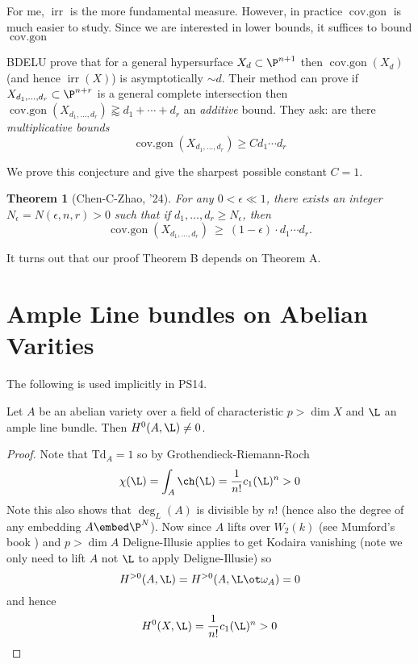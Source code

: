 \documentclass[12pt]{article}
\theoremstyle{plain}
\newtheorem{Lthm}{Theorem}
\DeclareMathOperator{\irr}{irr}
\DeclareMathOperator{\cg}{cov.gon}
\begin{document}
{\color{red} For me, $\irr$ is the more fundamental measure. However, in practice $\cg$ is much easier to study. Since we are interested in lower bounds, it suffices to bound $\cg$}

BDELU prove that for a general hypersurface $X_d \subset \P^{n+1}$ then $\cg(X_d)$ (and hence $\irr(X)$) is asymptotically $\sim d$. Their method can prove if $X_{d_1, \dots, d_r} \subset \P^{n+r}$ is a general complete intersection then $\cg(X_{d_1, \dots, d_r}) \gtrapprox d_1 + \cdots + d_r$ an \textit{additive} bound. They ask: are there \textit{multiplicative bounds}
\[ \cg(X_{d_1, \dots, d_r}) \ge C d_1 \cdots d_r \]

{\color{red} We prove this conjecture and give the sharpest possible constant $C = 1$.}

\begin{Lthm}[Chen-C-Zhao, '24]
For any $0 < \epsilon \ll 1$, there exists an integer $N_{\epsilon} = N(\epsilon, n, r) > 0$ such that if $d_1, \dots, d_r \ge N_\epsilon$, then
\[ \cg(X_{d_1, \dots, d_r}) \ \geq \  (1-\epsilon) \cdot d_{1} \cdots d_{r}. \]
\end{Lthm}

{\color{red} It turns out that our proof Theorem B depends on Theorem A. }

\section{Ample Line bundles on Abelian Varities}

The following is used implicitly in PS14.

\newcommand{\Td}{\mathrm{Td}}

\begin{prop}
Let $A$ be an abelian variety over a field of characteristic $p > \dim{X}$ and $\L$ an ample line bundle. Then $H^0(A, \L) \neq 0$.
\end{prop}

\begin{proof}
Note that $\Td_A = 1$ so by Grothendieck-Riemann-Roch
\[ \chi(\L) = \int_A \mathrm{\ch}(\L) = \frac{1}{n!} c_1(\L)^n > 0 \]
Note this also shows that $\deg_L(A)$ is divisible by $n!$ (hence also the degree of any embedding $A \embed \P^N$). Now since $A$ lifts over $W_2(k)$ (see Mumford's book ) and $p > \dim{A}$ Deligne-Illusie applies to get Kodaira vanishing (note we only need to lift $A$ not $\L$ to apply Deligne-Illusie) so 
\[ H^{>0}(A, \L) = H^{>0}(A, \L \ot \omega_A) = 0 \]
and hence
\[ H^0(X, \L) = \frac{1}{n!} c_1(\L)^n > 0 \]
\end{proof}
\end{document}
